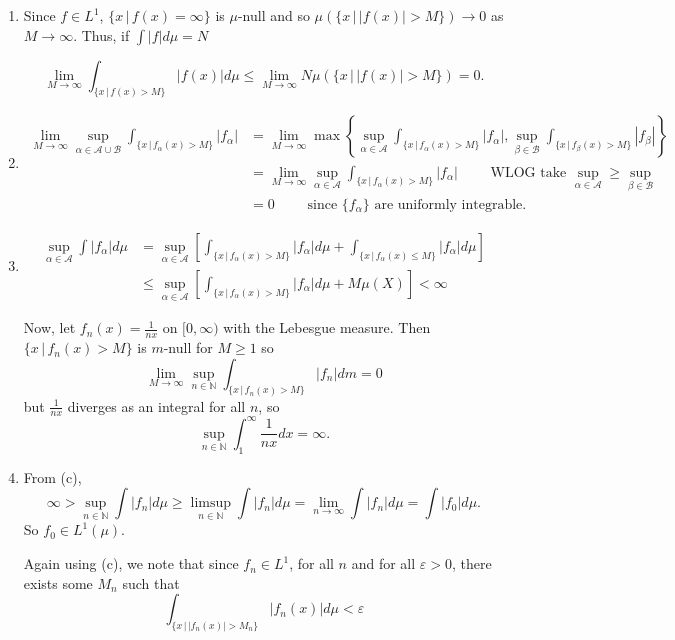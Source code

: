 \documentclass[12pt]{Homework}
\begin{document}
\begin{solution}$\,$
\begin{enumerate}[label=(\alph*)]
    \item Since $f\in L^1$, $\{x\,|\,f(x)=\infty\}$ is $\mu$-null and so $\mu(\{x\,|\,|f(x)|>M\})\to0$ as $M\to\infty$. Thus, if $\int|f|d\mu=N$
    
    $$\lim_{M\to\infty}\int_{\{x\,|\,f(x)>M\}}|f(x)|d\mu\le\lim_{M\to\infty}N\mu(\{x\,|\,|f(x)|>M\})=0.$$
    \item \begin{align*}
        \lim_{M\to\infty}\sup_{\alpha\in\mathscr{A}\cup\mathscr{B}}\int_{\{x\,|\,f_\alpha(x)>M\}}|f_\alpha|&=\lim_{M\to\infty}\max\left\{\sup_{\alpha\in\mathscr{A}}\int_{\{x\,|\,f_\alpha(x)>M\}}|f_\alpha|,\sup_{\beta\in\mathscr{B}}\int_{\{x\,|\,f_\beta(x)>M\}}|f_\beta|\right\}\\
        &=\lim_{M\to\infty}\sup_{\alpha\in\mathscr{A}}\int_{\{x\,|\,f_\alpha(x)>M\}}|f_\alpha|\qquad\text{ WLOG take }\sup_{\alpha\in\mathscr{A}}\ge\sup_{\beta\in\mathscr{B}}\\
        &=0\qquad\text{ since }\{f_\alpha\}\text{ are uniformly integrable}.
    \end{align*}
    
    \item \begin{align*}
        \sup_{\alpha\in\mathscr{A}}\int|f_\alpha|d\mu&=\sup_{\alpha\in\mathscr{A}}\left[\int_{\{x\,|\,f_\alpha(x)>M\}}|f_\alpha|d\mu+\int_{\{x\,|\,f_\alpha(x)\le M\}}|f_\alpha|d\mu\right]\\
        &\le\sup_{\alpha\in\mathscr{A}}\left[\int_{\{x\,|\,f_\alpha(x)>M\}}|f_\alpha|d\mu+M\mu(X)\right]<\infty
    \end{align*}
    
    Now, let $f_n(x)=\frac{1}{nx}$ on $[0,\infty)$ with the Lebesgue measure. Then $\{x\,|\,f_n(x)>M\}$ is $m$-null for $M\ge1$ so $$\lim_{M\to\infty}\sup_{n\in\mathbb{N}}\int_{\{x\,|\,f_n(x)>M\}}|f_n|dm=0$$ but $\frac{1}{nx}$ diverges as an integral for all $n$, so $$\sup_{n\in\mathbb{N}}\int_1^\infty\frac{1}{nx}dx=\infty.$$
    \item From (c), $$\infty>\sup_{n\in\mathbb{N}}\int|f_n|d\mu\ge\limsup_{n\in\mathbb{N}}\int|f_n|d\mu=\lim_{n\to\infty}\int|f_n|d\mu=\int|f_0|d\mu.$$ So $f_0\in L^1(\mu)$.
    
    Again using (c), we note that since $f_n\in L^1$, for all $n$ and for all $\varepsilon>0$, there exists some $M_n$ such that $$\int_{\{x\,|\,|f_n(x)|>M_n\}}|f_n(x)|d\mu<\varepsilon$$
    

\end{enumerate}
\end{solution}
\end{document}
